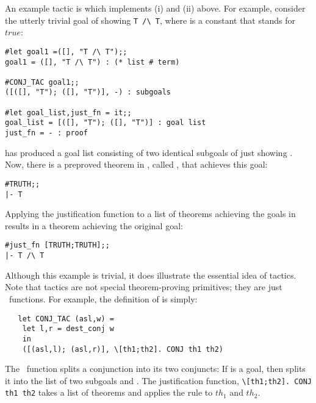 An example tactic is  which implements (i) and (ii) above.
For example, consider the utterly trivial goal of showing {\small\verb|T /\ T|},
where  is a constant that stands for $true$:

\begin{session}\begin{verbatim}
#let goal1 =([], "T /\ T");;
goal1 = ([], "T /\ T") : (* list # term)

#CONJ_TAC goal1;;
([([], "T"); ([], "T")], -) : subgoals

#let goal_list,just_fn = it;;
goal_list = [([], "T"); ([], "T")] : goal list
just_fn = - : proof
\end{verbatim}\end{session}

\noindent {} has produced a goal  list consisting  of two identical
subgoals of just showing .  Now, there  is a  preproved theorem in
\HOL, called , that achieves this goal:

\begin{session}\begin{verbatim}
#TRUTH;;
|- T
\end{verbatim}\end{session}

\noindent Applying the justification function  to a list
of theorems achieving the goals in  results
in a theorem achieving the original goal:

\begin{session}\begin{verbatim}
#just_fn [TRUTH;TRUTH];;
|- T /\ T
\end{verbatim}\end{session}

Although this  example  is trivial,  it does  illustrate the  essential idea of
tactics.  Note that  tactics are  not special  theorem-proving primitives; they
are just  \ML\  functions.   For example,  the definition  of  is
simply:

\begin{hol}\begin{verbatim}
   let CONJ_TAC (asl,w) =
    let l,r = dest_conj w
    in
    ([(asl,l); (asl,r)], \[th1;th2]. CONJ th1 th2)
\end{verbatim}\end{hol}

\noindent The \ML\ function  splits a conjunction into its
two conjuncts:
If 
is a goal, then  splits
it into the list of two subgoals  and
. The justification function,
{\small\verb|\[th1;th2]. CONJ th1 th2|}
takes
a list \ml{[$th_1$;$th_2$]} of theorems and applies the rule 
to $th_1$ and $th_2$.

